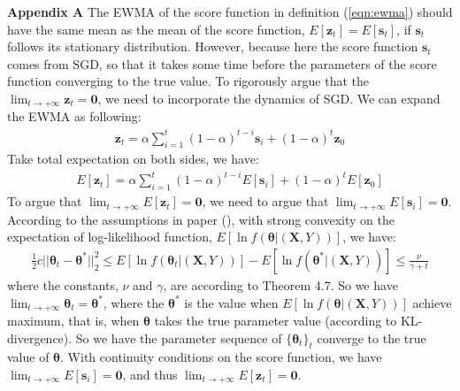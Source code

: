 \documentclass[twoside,11pt]{article}
\begin{document}
\begin{appendix}
\textbf{Appendix A}
\label{app:sgd_ewma}
The EWMA of the score function in definition (\ref{eqn:ewma}) should have the same mean as the mean of the score function, $E[\bm {z}_t]=E[\bm {s}_t]$, if $\bm {s}_t$ follows its stationary distribution. However, because here the score function $\bm {s}_t$ comes from SGD, so that it takes some time before the parameters of the score function converging to the true value. To rigorously argue that the $\lim _{t\to +\infty}\bm {z}_t=\bm{0}$, we need to incorporate the dynamics of SGD. We can expand the EWMA as following:
\begin{align}
\bm {z}_t = \alpha \sum _{i=1}^t (1- \alpha)^{t-i}\bm {s}_i + (1- \alpha)^t \bm {z}_0 
\label{eqn:ewma_expa}
\end{align}
Take total expectation on both sides, we have:
\begin{align}
E[\bm {z}_t] = \alpha \sum	_{i=1}^t (1- \alpha) ^{t-i} E[\bm {s}_i] + (1- \alpha)^t E[\bm {z}_0]
\label{eqn:exp_ewma_expa}
\end{align}
To argue that $\lim _{t\to +\infty}E[\bm {z}_t]=\bm{0}$, we need to argue that $\lim _{t\to +\infty} E[\bm {s}_i] =\bm {0}$. According to the assumptions in paper (\cite{bottou2018optimization}), with strong convexity on the expectation of log-likelihood function, $E[\ln f ( \bm { \theta}| (\bm {X}, Y))]$, we have:
\begin{align}
\frac{1}{2}c||\bm { \theta}_t - \bm { \theta}^*||_2^2 \leq E[\ln f ( \bm { \theta}_t| (\bm {X}, Y))]-E[\ln f ( \bm { \theta}^*| (\bm {X}, Y))] \leq \frac{ \nu}{ \gamma+t} 
\end{align}
where the constants, $ \nu$ and $ \gamma$, are according to Theorem 4.7. So we have $\lim _{t\to+\infty} \bm { \theta}_t = \bm { \theta}^*$, where the $ \bm { \theta}^*$ is the value when $E[\ln f ( \bm { \theta}| (\bm {X}, Y))]$ achieve maximum, that is, when $\bm { \theta}$ takes the true parameter value (according to KL-divergence). So we have the parameter sequence of $\{\bm { \theta}_t\}_t$ converge to the true value of $\bm { \theta}$. With continuity conditions on the score function, we have $\lim _{t\to +\infty} E[\bm {s}_i] =\bm {0}$, and thus $\lim _{t\to +\infty}E[\bm {z}_t]=\bm{0}$.
\end{appendix}


\end{document}
